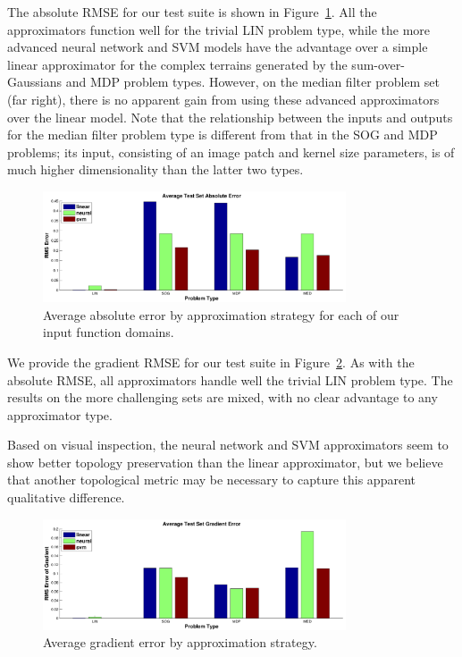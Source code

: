 \documentclass{article}
\begin{document}
The absolute RMSE for our test suite is shown in Figure~\ref{fig:results_absolute_rmse}. All the approximators function well for the trivial LIN problem type, while the more advanced neural network and SVM models have the advantage over a simple linear approximator for the complex terrains generated by the sum-over-Gaussians and MDP problem types. However, on the median filter problem set (far right), there is no apparent gain from using these advanced approximators over the linear model. Note that the relationship between the inputs and outputs for the median filter problem type is different from that in the SOG and MDP problems; its input, consisting of an image patch and kernel size parameters, is of much higher dimensionality than the latter two types.


\begin{figure}
  \centering
  \includegraphics[width=0.8\textwidth]{images/results_rmse_noorig}
  \caption{Average absolute error by approximation strategy for each of our input function domains.}
  \label{fig:results_absolute_rmse}
\end{figure}

We provide the gradient RMSE for our test suite in Figure~\ref{fig:results_grad_rmse}. As with the absolute RMSE, all approximators handle well the trivial LIN problem type. The results on the more challenging sets are mixed, with no clear advantage to any approximator type.

Based on visual inspection, the neural network and SVM approximators seem to show better topology preservation than the linear approximator, but we believe that another topological metric may be necessary to capture this apparent qualitative difference.

\begin{figure}
  \centering
  \includegraphics[width=0.8\textwidth]{images/results_grad_rmse_noorig}
  \caption{Average gradient error by approximation strategy. }
  \label{fig:results_grad_rmse}
\end{figure}
\end{document}
